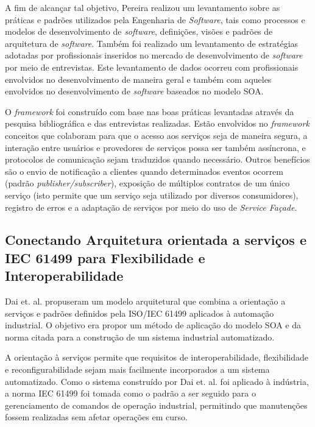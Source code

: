 A fim de alcançar tal objetivo, Pereira realizou um levantamento sobre as práticas e padrões utilizados pela Engenharia de \textit{Software}, tais como processos e modelos de desenvolvimento de \textit{software}, definições, visões e padrões de arquitetura de \textit{software}. Também foi realizado um levantamento de estratégias adotadas por profissionais inseridos no mercado de desenvolvimento de \textit{software} por meio de entrevistas. Este levantamento de dados ocorreu com profissionais envolvidos no desenvolvimento de maneira geral e também com aqueles envolvidos no desenvolvimento de \textit{software} baseados no modelo SOA.

O \textit{framework} foi construído com base nas boas práticas levantadas através da pesquisa bibliográfica e das entrevistas realizadas. Estão envolvidos no \textit{framework} conceitos que colaboram para que o acesso aos serviços seja de maneira segura, a interação entre usuários e provedores de serviços possa ser também assíncrona, e protocolos de comunicação sejam traduzidos quando necessário. Outros benefícios são o envio de notificação a clientes quando determinados eventos ocorrem (padrão \textit{publisher/subscriber}), exposição de múltiplos contratos de um único serviço (isto permite que um serviço seja utilizado por diversos consumidores), registro de erros e a adaptação de serviços por meio do uso de \textit{Service Façade}.

\subsection{Conectando Arquitetura orientada a serviços e IEC 61499 para Flexibilidade e Interoperabilidade}

Dai et. al. \cite{dai_bridging_2015} propuseram um modelo arquitetural que combina a orientação a serviços e padrões definidos pela ISO/IEC 61499 aplicados à automação industrial. O objetivo era propor um método de aplicação do modelo SOA e da norma citada para a construção de um sistema industrial automatizado.

A orientação à serviços permite que requisitos de interoperabilidade, flexibilidade e reconfigurabilidade sejam mais facilmente incorporados a um sistema automatizado. Como o sistema construído por Dai et. al. \cite{dai_bridging_2015} foi aplicado à indústria, a norma IEC 61499 foi tomada como o padrão a ser seguido para o gerenciamento de comandos de operação industrial, permitindo que manutenções fossem realizadas sem afetar operações em curso.


